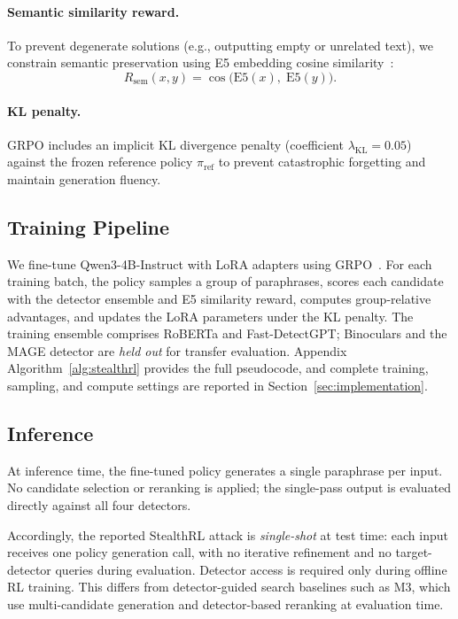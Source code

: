 \documentclass[11pt]{article}
\begin{document}
\paragraph{Semantic similarity reward.} To prevent degenerate solutions (e.g., outputting empty or unrelated text), we constrain semantic preservation using E5 embedding cosine similarity~\cite{wang2022e5}:
\begin{equation}
  R_{\text{sem}}(x, y) = \cos\bigl(\text{E5}(x),\; \text{E5}(y)\bigr).
\end{equation}

\paragraph{KL penalty.} GRPO includes an implicit KL divergence penalty (coefficient $\lambda_{\text{KL}} = 0.05$) against the frozen reference policy $\pi_{\text{ref}}$ to prevent catastrophic forgetting and maintain generation fluency.

\subsection{Training Pipeline}
\label{sec:training}

We fine-tune Qwen3-4B-Instruct with LoRA adapters using GRPO~\cite{pang2025grpo}. For each training batch, the policy samples a group of paraphrases, scores each candidate with the detector ensemble and E5 similarity reward, computes group-relative advantages, and updates the LoRA parameters under the KL penalty. The training ensemble comprises RoBERTa and Fast-DetectGPT; Binoculars and the MAGE detector are \emph{held out} for transfer evaluation. Appendix Algorithm~\ref{alg:stealthrl} provides the full pseudocode, and complete training, sampling, and compute settings are reported in Section~\ref{sec:implementation}.

\subsection{Inference}
\label{sec:inference}

At inference time, the fine-tuned policy generates a single paraphrase per input. No candidate selection or reranking is applied; the single-pass output is evaluated directly against all four detectors.

Accordingly, the reported StealthRL attack is \emph{single-shot} at test time: each input receives one policy generation call, with no iterative refinement and no target-detector queries during evaluation. Detector access is required only during offline RL training. This differs from detector-guided search baselines such as M3, which use multi-candidate generation and detector-based reranking at evaluation time.
\end{document}
